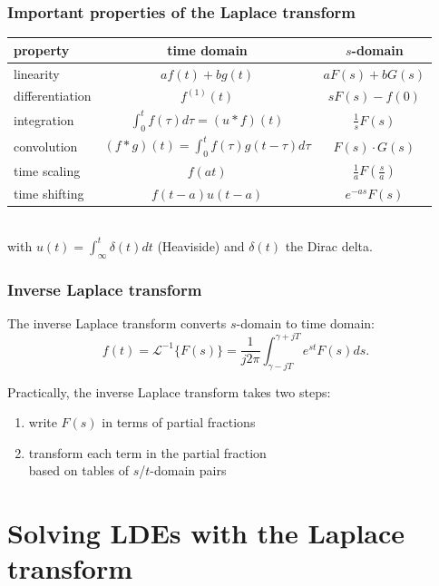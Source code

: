 \begin{frame}
\frametitle{Important properties of the Laplace transform}
\centering
\begin{tabular}{lcc}
\textbf{property}	& \textbf{time domain}	& \textbf{$s$-domain} \\
\midrule
linearity	& $af(t)+bg(t)$ & $aF(s) + bG(s)$ \\
\vspace{4ex}
differentiation	& $f^{(1)}(t)$	& $s F(s) - f(0)$ \\
\vspace{4ex}
integration	& $\int_0^t f(\tau)d\tau = (u*f)(t)$	&	$\frac{1}{s}F(s)$ \\
\vspace{4ex}
convolution	& $(f * g)(t)=\int_0^t f(\tau)g(t-\tau)d\tau$	& $F(s)\cdot G(s)$ \\
\vspace{4ex}
time scaling	& $f(at)$	& $\frac{1}{a}F(\frac{s}{a})$ \\
\vspace{4ex}
time shifting	& $f(t-a)u(t-a)$	& $e^{-as} F(s)$ \\
\end{tabular} \\
with $u(t)=\int_\infty^t \delta(t)dt$ (Heaviside) and $\delta(t)$ the Dirac delta.
\end{frame}

\begin{frame}
\frametitle{Inverse Laplace transform}
\begin{definition}
The inverse Laplace transform converts $s$-domain to time domain:
\begin{equation*}
f(t) = \mathcal{L}^{-1}\{F(s)\} = \frac{1}{j2\pi}\int_{\gamma-jT}^{\gamma+jT} e^{st} F(s) ds.
\end{equation*}
\end{definition}
\vspace{1em}
Practically, the inverse Laplace transform takes two steps:
\begin{enumerate}
\item write $F(s)$ in terms of partial fractions
\item transform each term in the partial fraction \\ based on tables of $s$/$t$-domain pairs 
\end{enumerate}
\end{frame}

\section{Solving LDEs with the Laplace transform}


